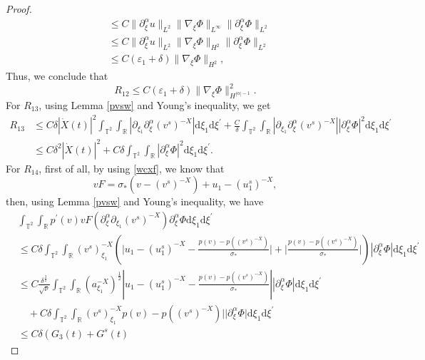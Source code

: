 \documentclass[10pt,reqno]{amsart}
\numberwithin{equation}{section}
\newcommand{\dif}{\mathrm{d}}
\begin{document}
\begin{proof}
\begin{align*}
&\le C\|\partial_{\xi}^{\alpha} u\|_{L^2}\|\nabla_\xi\Phi\|_{L^\infty}\|\partial_{\xi}^\alpha\Phi\|_{L^2}\\
&\le C\|\partial_{\xi}^{\alpha} u\|_{L^2}\|\nabla_\xi\Phi\|_{H^2}\|\partial_{\xi}^\alpha\Phi\|_{L^2}\\
&\le C(\varepsilon_1+\delta)\|\nabla_\xi\Phi\|_{H^2},
\end{align*}
Thus, we conclude that
\begin{equation}\label{r12}
R_{12}\le
C(\varepsilon_1+\delta)
\|\nabla_\xi\Phi\|_{H^{|\alpha|-1}}^2
.
\end{equation}
For $R_{13}$, using Lemma \ref{pvsw} and Young's inequality, we get
\begin{equation}\label{r13}
\begin{aligned}
R_{13}&\le C\delta|\dot{X}(t)|^2\int_{\mathbb{T}^2}\int_{\mathbb{R}}|\partial_{\xi_1}\partial_\xi^\alpha(v^s)^{-X}|\dif \xi_1\dif \xi^{\prime}
+\frac{C}{\delta}\int_{\mathbb{T}^2}\int_{\mathbb{R}}|\partial_{\xi_1}\partial_\xi^\alpha(v^s)^{-X}||\partial_\xi^\alpha\Phi|^2\dif \xi_1\dif \xi^{\prime}\\
&\le C\delta^2|\dot{X}(t)|^2+C\delta\int_{\mathbb{T}^2}\int_{\mathbb{R}}|\partial_\xi^\alpha\Phi|^2\dif \xi_1\dif \xi^{\prime}.
\end{aligned}
\end{equation}
For $R_{14}$, first of all, by using \eqref{wcxf}, we know that
\[
vF=\sigma_\ast(v-(v^s)^{-X})+u_1-(u_1^s)^{-X},
\]
then, using Lemma \ref{pvsw} and Young's inequality, we have
\begin{align*}
&\int_{\mathbb{T}^2}\int_{\mathbb{R}}p^\prime(v)vF\left(\partial_\xi^\alpha\partial_{\xi_1}(v^s)^{-X}\right)\partial_\xi^\alpha\Phi\dif \xi_1\dif \xi^{\prime}\\
&\le C\delta\int_{\mathbb{T}^2}\int_{\mathbb{R}}(v^s)^{-X}_{\xi_1}
\left(\Big|u_1-(u_1^s)^{-X}-\frac{p(v)-p((v^s)^{-X})}{\sigma_\ast}\Big|
+\Big|\frac{p(v)-p((v^s)^{-X})}{\sigma_\ast}\Big|\right)
|\partial_\xi^\alpha\Phi|\dif \xi_1\dif \xi^{\prime}
\\
&\le C\frac{\delta^{\frac{3}{2}}}{\sqrt{\nu}}
\int_{\mathbb{T}^2}\int_{\mathbb{R}}\left(a^{-X}_{\xi_1}\right)^{\frac{1}{2}}
|u_1-(u_1^s)^{-X}-\frac{p(v)-p((v^s)^{-X})}{\sigma_\ast}|
|\partial_\xi^\alpha\Phi|\dif \xi_1\dif \xi^{\prime}\\
&\quad+C\delta\int_{\mathbb{T}^2}\int_{\mathbb{R}}(v^s)^{-X}_{\xi_1}
p(v)-p((v^s)^{-X})||\partial_\xi^\alpha\Phi|\dif \xi_1\dif \xi^{\prime}\\
&\le C\delta\left(G_3(t)+G^s(t)

\end{align*}
\end{proof}
\end{document}
